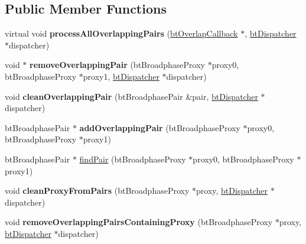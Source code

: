 \subsection*{Public Member Functions}
\begin{DoxyCompactItemize}
\item 
\mbox{\label{classbtSortedOverlappingPairCache_a0d53253e9ec500d3e1982e7631a2ddd2}} 
virtual void {\bfseries process\+All\+Overlapping\+Pairs} (\hyperlink{structbtOverlapCallback}{bt\+Overlap\+Callback} $\ast$, \hyperlink{classbtDispatcher}{bt\+Dispatcher} $\ast$dispatcher)
\item 
\mbox{\label{classbtSortedOverlappingPairCache_aac784674692808a8f7a7282e7c136850}} 
void $\ast$ {\bfseries remove\+Overlapping\+Pair} (bt\+Broadphase\+Proxy $\ast$proxy0, bt\+Broadphase\+Proxy $\ast$proxy1, \hyperlink{classbtDispatcher}{bt\+Dispatcher} $\ast$dispatcher)
\item 
\mbox{\label{classbtSortedOverlappingPairCache_a93515a9a3bc255484af4024b802bee0d}} 
void {\bfseries clean\+Overlapping\+Pair} (bt\+Broadphase\+Pair \&pair, \hyperlink{classbtDispatcher}{bt\+Dispatcher} $\ast$dispatcher)
\item 
\mbox{\label{classbtSortedOverlappingPairCache_a3de8d574d45d3a589dadd1024a7f1484}} 
bt\+Broadphase\+Pair $\ast$ {\bfseries add\+Overlapping\+Pair} (bt\+Broadphase\+Proxy $\ast$proxy0, bt\+Broadphase\+Proxy $\ast$proxy1)
\item 
bt\+Broadphase\+Pair $\ast$ \hyperlink{classbtSortedOverlappingPairCache_a73b6665ffd9874f0575b72d07761ce8d}{find\+Pair} (bt\+Broadphase\+Proxy $\ast$proxy0, bt\+Broadphase\+Proxy $\ast$proxy1)
\item 
\mbox{\label{classbtSortedOverlappingPairCache_acf542ec63da3047a2e9e04cb03d6bfe8}} 
void {\bfseries clean\+Proxy\+From\+Pairs} (bt\+Broadphase\+Proxy $\ast$proxy, \hyperlink{classbtDispatcher}{bt\+Dispatcher} $\ast$dispatcher)
\item 
\mbox{\label{classbtSortedOverlappingPairCache_a77a9dc74c2250b05524b6c20d969bb68}} 
void {\bfseries remove\+Overlapping\+Pairs\+Containing\+Proxy} (bt\+Broadphase\+Proxy $\ast$proxy, \hyperlink{classbtDispatcher}{bt\+Dispatcher} $\ast$dispatcher)

\end{DoxyCompactItemize}
